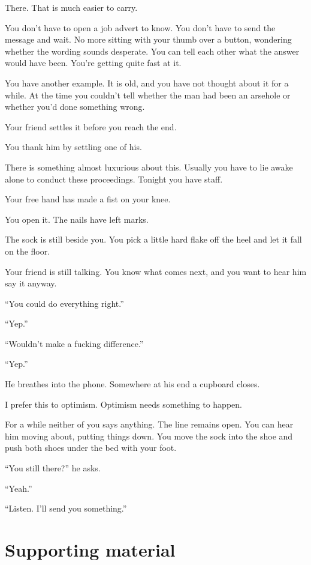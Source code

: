 \documentclass[11pt,oneside]{book}
\begin{document}
There. That is much easier to carry.

You don't have to open a job advert to know. You don't have to send the message and wait. No more sitting with your thumb over a button, wondering whether the wording sounds desperate. You can tell each other what the answer would have been. You're getting quite fast at it.

You have another example. It is old, and you have not thought about it for a while. At the time you couldn't tell whether the man had been an arsehole or whether you'd done something wrong.

Your friend settles it before you reach the end.

You thank him by settling one of his.

There is something almost luxurious about this. Usually you have to lie awake alone to conduct these proceedings. Tonight you have staff.

Your free hand has made a fist on your knee.

You open it. The nails have left marks.

The sock is still beside you. You pick a little hard flake off the heel and let it fall on the floor.

Your friend is still talking. You know what comes next, and you want to hear him say it anyway.

``You could do everything right.''

``Yep.''

``Wouldn't make a fucking difference.''

``Yep.''

He breathes into the phone. Somewhere at his end a cupboard closes.

I prefer this to optimism. Optimism needs something to happen.

For a while neither of you says anything. The line remains open. You can hear him moving about, putting things down. You move the sock into the shoe and push both shoes under the bed with your foot.

``You still there?'' he asks.

``Yeah.''

``Listen. I'll send you something.''

\section*{Supporting material}
\end{document}

